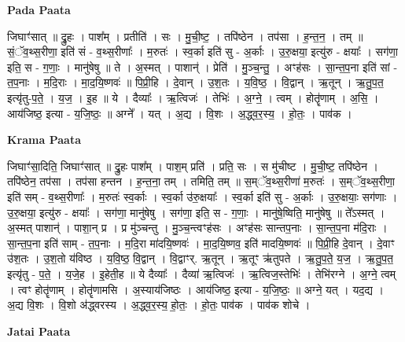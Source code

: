 \documentclass[17pt]{extarticle}
\begin{document}
\textbf{Pada Paata} \newline

जिघाꣳ॑सात् ॥ द्रु॒हः । पाश᳚म् । प्रतीति॑ । सः । मु॒ची॒ष्ट॒ । तपि॑ष्ठेन । तप॑सा । ह॒न्त॒न॒ । तम् ॥ सं॒ॅव॒थ्स॒रीणा॒ इति॑ सं - व॒थ्स॒रीणाः᳚ । म॒रुतः॑ । स्व॒र्का इति॑ सु - अ॒र्काः । उ॒रु॒क्षया॒ इत्यु॑रु - क्षयाः᳚ । सग॑णा॒ इति॒ स - ग॒णाः॒ । मानु॑षेषु ॥ ते । अ॒स्मत् । पाशान्॑ । प्रेति॑ । मु॒ञ्च॒न्तु॒ । अꣳह॑सः । सा॒न्त॒प॒ना इति॑ सां - त॒प॒नाः । म॒दि॒राः । मा॒द॒यि॒ष्णवः॑ ॥ पि॒प्री॒हि । दे॒वान् । उ॒श॒तः । य॒वि॒ष्ठ॒ । वि॒द्वान् । ऋ॒तून् । ऋ॒तु॒प॒त॒ इत्यृ॑तु-प॒ते॒ । य॒ज॒ । इ॒ह ॥ ये । दैव्याः᳚ । ऋ॒त्विजः॑ । तेभिः॑ । अ॒ग्ने॒ । त्वम् । होतॄ॑णाम् । अ॒सि॒ । आय॑जिष्ठ॒ इत्या - य॒जि॒ष्ठः॒ ॥ अग्ने᳚ । यत् । अ॒द्य । वि॒शः । अ॒द्ध्व॒र॒स्य॒ । हो॒तः॒ । पाव॑क ।  \newline


\textbf{Krama Paata} \newline

जिघाꣳ॑सा॒दिति॒ जिघाꣳ॑सात् ॥ द्रु॒हः पाश᳚म् । पाश॒म् प्रति॑ । प्रति॒ सः । स मु॑चीष्ट । मु॒ची॒ष्ट॒ तपि॑ष्ठेन । तपि॑ष्ठेन॒ तप॑सा । तप॑सा हन्तन । ह॒न्त॒ना॒ तम् । तमिति॒ तम् ॥ स॒म्ॅव॒थ्स॒रीणा॑ म॒रुतः॑ । स॒म्ॅव॒थ्स॒रीणा॒ इति॑ सम् - व॒थ्स॒रीणाः᳚ । म॒रुतः॑ स्व॒र्काः । स्व॒र्का उ॑रु॒क्षयाः᳚ । स्व॒र्का इति॑ सु - अ॒र्काः । उ॒रु॒क्षयाः॒ सग॑णाः । उ॒रु॒क्षया॒ इत्यु॑रु - क्षयाः᳚ । सग॑णा॒ मानु॑षेषु । सग॑णा॒ इति॒ स - ग॒णाः॒ । मानु॑षे॒ष्विति॒ मानु॑षेषु ॥ ते᳚ऽस्मत् । अ॒स्मत् पाशान्॑ । पाशा॒न् प्र । प्र मु॑ञ्चन्तु । मु॒ञ्च॒न्त्वꣳह॑सः । अꣳह॑सः सान्तप॒नाः । सा॒न्त॒प॒ना म॑दि॒राः । सा॒न्त॒प॒ना इति॑ साम् - त॒प॒नाः । म॒दि॒रा मा॑दयि॒ष्णवः॑ । मा॒द॒यि॒ष्णव॒ इति॑ मादयि॒ष्णवः॑ ॥ पि॒प्री॒हि दे॒वान् । दे॒वाꣳ उ॑श॒तः । उ॒श॒तो य॑विष्ठ । य॒वि॒ष्ठ॒ वि॒द्वान् । वि॒द्वाꣳर्. ऋ॒तून् । ऋ॒तूꣳ ऋ॑तुपते । ऋ॒तु॒प॒ते॒ य॒ज॒ । ऋ॒तु॒प॒त॒ इत्यृ॑तु - प॒ते॒ । य॒जे॒ह । इ॒हेती॒ह ॥ ये दैव्याः᳚ । दैव्या॑ ऋ॒त्विजः॑ । ऋ॒त्विज॒स्तेभिः॑ । तेभि॑रग्ने । अ॒ग्ने॒ त्वम् । त्वꣳ होतॄ॑णाम् । होतॄ॑णामसि । अ॒स्याय॑जिष्ठः । आय॑जिष्ठ॒ इत्या - य॒जि॒ष्ठः॒ ॥ अग्ने॒ यत् । यद॒द्य । अ॒द्य वि॒शः । वि॒शो अ॑द्ध्वरस्य । अ॒द्ध्व॒र॒स्य॒ हो॒तः॒ । हो॒तः॒ पाव॑क । पाव॑क शोचे । \newline

\textbf{Jatai Paata} \newline
\end{document}
